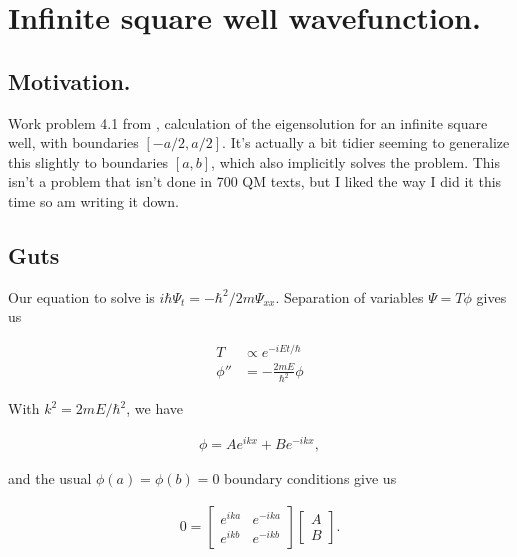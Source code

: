 
%

\chapter{Infinite square well wavefunction.}
\label{chap:liboff41}
{}
\date{May 31, 2010}

\beginArtNoToc

\section{Motivation.}

Work problem 4.1 from \cite{liboff2003iqm}, calculation of the eigensolution for an infinite square well, with boundaries $[-a/2, a/2]$.  It's actually a bit tidier seeming to generalize this slightly to boundaries $[a,b]$, which also implicitly solves the problem.  This isn't a problem that isn't done in 700 QM texts, but I liked the way I did it this time so am writing it down.

\section{Guts}

Our equation to solve is $i \hbar \Psi_t = -\hbar^2/2m \Psi_{xx}$.  Separation of variables $\Psi = T \phi$ gives us

\begin{align}\label{eqn:liboff41:1}
T &\propto e^{-i E t/\hbar } \\
\phi'' &= -\frac{2 m E }{\hbar^2} \phi
\end{align}

With $k^2 = 2 m E/\hbar^2$, we have

\begin{align}\label{eqn:liboff41:2}
\phi = A e^{i k x } + B e^{-i k x},
\end{align}

and the usual $\phi(a) = \phi(b) = 0$ boundary conditions give us

\begin{align}\label{eqn:liboff41:3}
0 = 
\begin{bmatrix}
e^{i k a } & e^{-i k a} \\
e^{i k b } & e^{-i k b}
\end{bmatrix}
\begin{bmatrix}
A \\
B
\end{bmatrix}.
\end{align}

